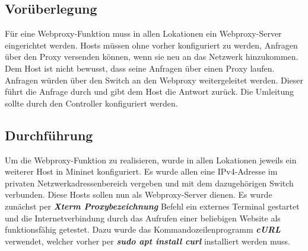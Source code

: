 \documentclass[fontsize=12pt,paper=a4,open=any,parskip=half,
  twoside=false,toc=listof,toc=bibliography,fleqn,leqno,
  captions=nooneline,captions=tableabove,british]{scrbook}
\begin{document}
\subsection{Vorüberlegung}
Für eine Webproxy-Funktion muss in allen Lokationen ein Webproxy-Server eingerichtet werden. Hosts müssen ohne vorher konfiguriert zu werden, Anfragen über den Proxy versenden können, wenn sie neu an das Netzwerk hinzukommen. Dem Host ist nicht bewusst, dass seine Anfragen über einen Proxy laufen. Anfragen würden über den Switch an den Webproxy weitergeleitet werden. Dieser führt die Anfrage durch und gibt dem Host die Antwort zurück. Die Umleitung sollte durch den Controller konfiguriert werden. 

\subsection{Durchführung}
Um die Webproxy-Funktion zu realisieren, wurde in allen Lokationen jeweils ein weiterer Host in Mininet konfiguriert. Es wurde allen eine IPv4-Adresse im privaten Netzwerkadressenbereich vergeben und mit dem dazugehörigen Switch verbunden. Diese Hosts sollen nun als Webproxy-Server dienen. Es wurde zunächst per \textit{\textbf{Xterm Proxybezeichnung}} Befehl ein externes Terminal gestartet und die Internetverbindung durch das Aufrufen einer beliebigen Website als funktionsfähig getestet. Dazu wurde das Kommandozeilenprogramm \textit{\textbf{cURL}} verwendet, welcher vorher per \textit{\textbf{sudo apt install curl}} installiert werden muss.
\end{document}
